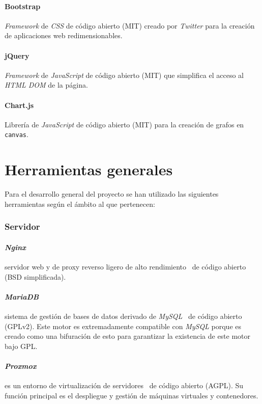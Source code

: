 \paragraph{Bootstrap~\cite{wiki:boostrap}}\textit{Framework} de \textit{CSS} de código abierto (MIT) creado por \textit{Twitter} para la creación de aplicaciones web redimensionables.
\paragraph{jQuery~\cite{wiki:jquery}}\textit{Framework} de \textit{JavaScript} de código abierto (MIT) que simplifica el acceso al \textit{HTML DOM} de la página.
\paragraph{Chart.js}Librería de \textit{JavaScript} de código abierto (MIT) para la creación de grafos en \texttt{canvas}.

\section{Herramientas generales}

Para el desarrollo general del proyecto se han utilizado las siguientes herramientas según el ámbito al que pertenecen:

\subsubsection{Servidor}
\paragraph{\textit{Nginx}}servidor web y de proxy reverso ligero de alto rendimiento~\cite{wiki:nginx} de código abierto (BSD simplificada).
\paragraph{\textit{MariaDB}}sistema de gestión de bases de datos derivado de \textit{MySQL}~\cite{wiki:mariadb} de código abierto (GPLv2). Este motor es extremadamente compatible con \textit{MySQL} porque es creado como una bifuración de esto para garantizar la existencia de este motor bajo GPL.
\paragraph{\textit{Proxmox}}es un entorno de virtualización de servidores~\cite{wiki:proxmox} de código abierto (AGPL). Su función principal es el despliegue y gestión de máquinas virtuales y contenedores.
